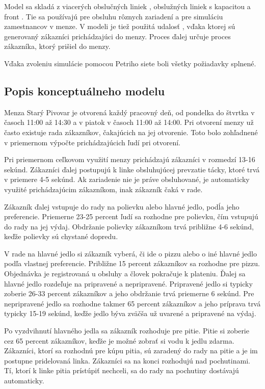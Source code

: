 \documentclass{article}
\begin{document}
Model sa skladá z viacerých obslučných liniek \cite[str. 163]{ims}, obslužných liniek s kapacitou \cite[str. 163]{ims} a front \cite[str. 163]{ims}. Tie sa používajú pre obsluhu rôznych zariadení a pre simuláciu zamestnancov v menze. V modeli je tiež použitá udalosť \cite[str. 163]{ims}, vďaka ktorej sú generovaný zákazníci prichádzajúci do menzy. Proces \cite[str. 163]{ims} ďalej určuje proces zákazníka, ktorý prišiel do menzy.

Vďaka zvoleniu simulácie pomocou Petriho siete boli všetky požiadavky splnené.

\subsection{Popis konceptuálneho modelu}
Menza Starý Pivovar je otvorená každý pracovný deň, od pondelka do štvrtka v časoch 11:00 až 14:30 a v piatok v časoch 11:00 až 14:00. Pri otvorení menzy už často existuje rada zákazníkov, čakajúcich na jej otvorenie. Toto bolo zohľadnené v priemernom výpočte prichádzajúcich ľudí pri otvorení.

Pri priemernom ceľkovom využití menzy prichádzajú zákazníci v rozmedzí 13-16 sekúnd. Zákazníci ďalej postupujú k linke obsluhujúcej prevzatie tácky, ktoré trvá v priemere 4-5 sekúnd. Ak zariadenie nie je práve obsluhované, je automaticky využité prichádzajúcim zákazníkom, inak zákazník čaká v rade.

Zákazník ďalej vstupuje do rady na polievku alebo hlavné jedlo, podĺa jeho preferencie. Priemerne 23-25 percent ľudí sa rozhodne pre polievku, čím vstupujú do rady na jej výdaj. Obdržanie polievky zákazníkom trvá približne 4-6 sekúnd, keďže polievky sú chystané dopredu.

V rade na hlavné jedlo si zákazník vyberá, či ide o pizzu alebo o iné hlavné jedlo podľa vlastnej preferencie. Približne 15 percent zákazníkov sa rozhodne pre pizzu. Objednávka je registrovaná u obsluhy a človek pokračuje k plateniu. Ďalej sa hlavné jedlo rozdeľuje na pripravené a nepripravené. Pripravené jedlo si typicky zoberie 26-33 percent zákazníkov a jeho obdržanie trvá priemerne 6 sekúnd. Pre nepripravené jedlo sa rozhodne takmer 65 percent zákazníkov a jeho príprava trvá typicky 15-19 sekúnd, keďže jedlo býva zväčša už uvarené a pripravené na výdaj.

Po vyzdvihnutí hlavného jedla sa zákazník rozhoduje pre pitie. Pitie si zoberie cez 65 percent zákazníkov, keďže je možné zobrať si vodu k jedlu zdarma. Zákazníci, ktorí sa rozhodnú pre kúpu pitia, sú zaradený do rady na pitie a je im postupne pridelovaná linka. Zákazníci sa na konci rozhodujú nad pochutinami. Tí, ktorí k linke pitia prístúpiť nechceli, sa do rady na pochutiny dostávajú automaticky.
\end{document}
